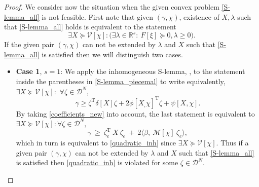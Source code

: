\documentclass[letterpaper,11pt]{article}
\newcommand{\T}{\mathrm{T}}
\newtheorem{proof}{Proof}
\begin{document}
\begin{proof}
	We consider now the situation when the given convex problem
	\eqref{S-lemma_all} is not feasible.
	First note that given $ (\gamma, \chi )$, existence of 
	$X, \lambda$ such that \eqref{S-lemma_all}
	holds is equivalent to the statement
	\begin{equation}
	\label{S-lemma_piecemal}
\exists X \succeq  \mathcal{V}[ \chi]:	\bigg(\exists \lambda \in \mathbb{R}^{s}: ~
	F[\xi]  \succeq 0,
	\lambda \geq 0\bigg).
	\end{equation}
	If the given pair $ (\gamma, \chi) $ can not 
	be extended by $  \lambda $ and $ X$ such that
	\eqref{S-lemma_all} is satisfied then we will distinguish two cases.
	\begin{itemize}
		\item \textbf{Case 1}, $s=1$:  
		We apply the
		inhomogeneous S-lemma,   \cite{ bental6}, to the statement inside the parentheses in \eqref{S-lemma_piecemal} to write equivalently,
		$ \exists X \succeq \mathcal{V}[ \chi]:$ $\forall \zeta \in \mathscr{D}^N,$
		$$
		\label{extended_quadratic} 
		\gamma  \geq   \zeta ^\T  \delta[X]    \zeta  + 2  \phi[X_,  \chi ]^{\T} \zeta 
		+  \psi[X,  \chi ].
		$$
		By taking \eqref{coefficients_new} into account, the last statement is equivalent to 
		$\exists X \succeq \mathcal{V}[ \chi] : \forall \zeta \in \mathscr{D}^N, $ 
		$$
		\gamma  ~\geq ~
		\zeta_e^\T ~ X~ \zeta_e ~+~ 2 \langle \beta,  ~ 
		\mathcal{M}[ \chi]~  \zeta_e \rangle, 
		$$
		which in turn is equivalent  to \eqref{quadratic_inh} since 
		$\exists X \succeq \mathcal{V}[ \chi] $.  Thus 
		if a given pair $ (\gamma, \chi) $ can not 
		be extended by $  \lambda $ and $ X$ such that
		\eqref{S-lemma_all} is satisfied then \eqref{quadratic_inh} is violated for some $  \zeta \in \mathscr{D}^N$.
		

\end{itemize}
\end{proof}
\end{document}
